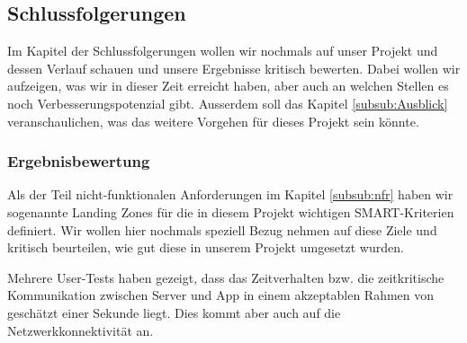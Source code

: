\subsection{Schlussfolgerungen}
\label{subsec:conclusions}
Im Kapitel der Schlussfolgerungen wollen wir nochmals auf unser Projekt und dessen Verlauf schauen und unsere Ergebnisse kritisch bewerten. Dabei wollen wir aufzeigen, was wir in dieser Zeit erreicht haben, aber auch an welchen Stellen es noch Verbesserungspotenzial gibt. Ausserdem soll das Kapitel \ref{subsub:Ausblick} veranschaulichen, was das weitere Vorgehen für dieses Projekt sein könnte.

\subsubsection{Ergebnisbewertung}
\label{subsec:ergebnisbewertung}


Als der Teil nicht-funktionalen Anforderungen im Kapitel \ref{subsub:nfr} haben wir sogenannte Landing Zones für die in diesem Projekt wichtigen SMART-Kriterien definiert. Wir wollen hier nochmals speziell Bezug nehmen auf diese Ziele und kritisch beurteilen, wie gut diese in unserem Projekt umgesetzt wurden.
 
 Mehrere User-Tests haben gezeigt, dass das Zeitverhalten bzw. die zeitkritische Kommunikation zwischen Server und App in einem akzeptablen Rahmen von geschätzt einer Sekunde liegt. Dies kommt aber auch auf die Netzwerkkonnektivität an. 
 
